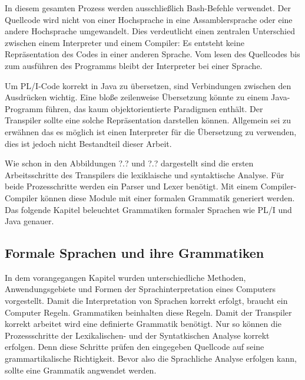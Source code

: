 In diesem gesamten Prozess werden ausschließlich Bash-Befehle verwendet. Der Quellcode wird nicht von einer Hochsprache in eine Assamblersprache oder eine andere Hochsprache umgewandelt. Dies verdeutlicht einen zentralen Unterschied zwischen einem Interpreter und einem Compiler: Es entsteht keine Repräsentation des Codes in einer anderen Sprache. Vom lesen des Quellcodes bis zum ausführen des Programms bleibt der Interpreter bei einer Sprache. 

Um PL/I-Code korrekt in Java zu übersetzen, sind Verbindungen zwischen den Ausdrücken wichtig. Eine bloße zeilenweise Übersetzung könnte zu einem Java-Programm führen, das kaum objektorientierte Paradigmen enthält. Der Transpiler sollte eine solche Repräsentation darstellen können.
Allgemein sei zu erwähnen das es möglich ist einen Interpreter für die Übersetzung zu verwenden, dies ist jedoch nicht Bestandteil dieser Arbeit.

Wie schon in den Abbildungen ?.? und ?.? dargestellt sind die ersten Arbeitsschritte des Transpilers die lexiklaische und syntaktische Analyse.
Für beide Prozesschritte werden ein Parser und Lexer benötigt. Mit einem Compiler-Compiler können diese Module mit einer formalen Grammatik generiert werden.
Das folgende Kapitel beleuchtet Grammatiken formaler Sprachen wie PL/I und Java genauer.


\pagebreak
   
   
\subsection{Formale Sprachen und ihre Grammatiken}
In dem vorangegangen Kapitel wurden unterschiedliche Methoden, Anwendungsgebiete und Formen der Sprachinterpretation eines Computers vorgestellt. Damit die Interpretation von Sprachen korrekt erfolgt, braucht ein Computer Regeln. Grammatiken beinhalten diese Regeln. Damit der Transpiler korrekt arbeitet wird eine definierte Grammatik benötigt. Nur so können die Prozessschritte der Lexikalischen- und der Syntatkischen Analyse korrekt erfolgen. Denn diese Schritte prüfen den eingegeben Quellcode auf seine grammartikalische Richtigkeit. Bevor also die Sprachliche Analyse erfolgen kann, sollte eine Grammatik angwendet werden.
	
